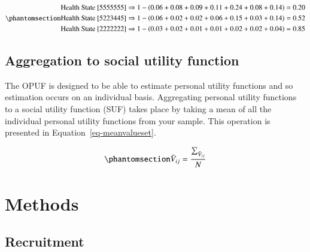 \documentclass[
  number,
  preprint]{elsarticle}
\begin{document}
\begin{equation}\phantomsection\label{eq-HS123}{
\begin{aligned}
\text{Health State [5555555]} & \Rightarrow 1 - (0.06 + 0.08 + 0.09 + 0.11 + 0.24 + 0.08 + 0.14) = 0.20 \\
\text{Health State [5223445]} & \Rightarrow 1 - (0.06 + 0.02 + 0.02 + 0.06 + 0.15 + 0.03 + 0.14) = 0.52 \\
\text{Health State [2222222]} & \Rightarrow 1 - (0.03 + 0.02 + 0.01 + 0.01 + 0.02 + 0.02 + 0.04) = 0.85
\end{aligned}
}\end{equation}

\subsection{Aggregation to social utility
function}\label{aggregation-to-social-utility-function}

The OPUF is designed to be able to estimate personal utility functions
and so estimation occurs on an individual basis. Aggregating personal
utility functions to a social utility function (SUF) takes place by
taking a mean of all the individual personal utility functions from your
sample. This operation is presented in Equation~\ref{eq-meanvalueset}.

\begin{equation}\phantomsection\label{eq-meanvalueset}{
\bar{V}_{{ij}} = \frac{\sum_{\tilde{V}_{{ij}}}^{}}{N}
}\end{equation}

\section{Methods}\label{methods}

\subsection{Recruitment}\label{recruitment}
\end{document}
